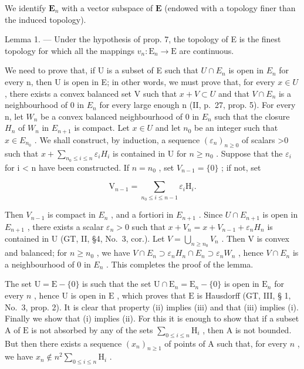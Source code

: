 We identify \(\mathbf{E}_n\) with a vector subspace of \(\mathbf{E}\) (endowed with a topology finer than the induced topology).

Lemma 1. --- Under the hypothesis of prop. 7, the topology of E is the finest topology for which all the mappings \(v_{n} : \mathrm{E}_{n} \to \mathrm{E}\) are continuous.

We need to prove that, if U is a subset of E such that \(U \cap E_{n}\) is open in \(E_{n}\) for every n, then U is open in E; in other words, we must prove that, for every \(x \in U\) , there exists a convex balanced set V such that \(x + V \subset U\) and that \(V \cap E_{n}\) is a neighbourhood of 0 in \(E_{n}\) for every large enough n (II, p.~27, prop. 5). For every n, let \(W_{n}\) be a convex balanced neighbourhood of 0 in \(E_{n}\) such that the closure \(H_{n}\) of \(W_{n}\) in \(E_{n+1}\) is compact. Let \(x \in U\) and let \(n_{0}\) be an integer such that \(x \in E_{n_{0}}\) . We shall construct, by induction, a sequence \((\varepsilon_{n})_{n \geqslant 0}\) of scalars \textgreater0 such that \(x + \sum_{n_{0} \leqslant i \leqslant n} \varepsilon_{i}H_{i}\) is contained in U for \(n \geqslant n_{0}\) . Suppose that the \(\varepsilon_{i}\) for i \textless{} n have been constructed. If \(n = n_{0}\) , set \(V_{n-1} = \{0\}\) ; if not, set

\[
\mathrm{V} _ {n - 1} = \sum_ {n _ {0} \leqslant i \leqslant n - 1} \varepsilon_ {i} \mathrm{H} _ {i}.
\]

Then \(V_{n-1}\) is compact in \(E_{n}\) , and a fortiori in \(E_{n+1}\) . Since \(U \cap E_{n+1}\) is open in \(E_{n+1}\) , there exists a scalar \(\varepsilon_{n} > 0\) such that \(x + V_{n} = x + V_{n-1} + \varepsilon_{n}H_{n}\) is contained in U (GT, II, §4, No.~3, cor.). Let \(V = \bigcup_{n \geqslant n_{0}} V_{n}\) . Then V is convex and balanced; for \(n \geqslant n_{0}\) , we have \(V \cap E_{n} \supset \varepsilon_{n}H_{n} \cap E_{n} \supset \varepsilon_{n}W_{n}\) , hence \(V \cap E_{n}\) is a neighbourhood of 0 in \(E_{n}\) . This completes the proof of the lemma.

The set \(\mathrm{U} = \mathrm{E} - \{0\}\) is such that the set \(\mathrm{U} \cap \mathrm{E}_n = \mathrm{E}_n - \{0\}\) is open in \(\mathrm{E}_n\) for every \(n\) , hence \(\mathrm{U}\) is open in \(\mathrm{E}\) , which proves that \(\mathrm{E}\) is Hausdorff (GT, III, § 1, No.~3, prop. 2). It is clear that property (ii) implies (iii) and that (iii) implies (i). Finally we show that (i) implies (ii). For this it is enough to show that if a subset \(\mathrm{A}\) of \(\mathrm{E}\) is not absorbed by any of the sets \(\sum_{0 \leqslant i \leqslant n} \mathrm{H}_i\) , then \(\mathrm{A}\) is not bounded. But then there exists a sequence \((x_n)_{n \geqslant 1}\) of points of \(\mathrm{A}\) such that, for every \(n\) , we have \(x_n \notin n^2 \sum_{0 \leqslant i \leqslant n} \mathrm{H}_i\) .

